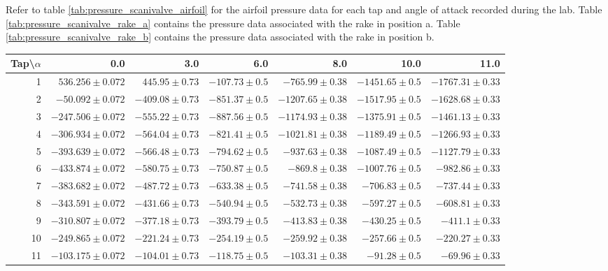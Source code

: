 \documentclass[runningheads]{llncs}
\begin{document}
Refer to table \ref{tab:pressure_scanivalve_airfoil} for the airfoil pressure data for each tap and angle of attack recorded during the lab. Table \ref{tab:pressure_scanivalve_rake_a} contains the pressure data associated with the rake in position a. Table \ref{tab:pressure_scanivalve_rake_b} contains the pressure data associated with the rake in position b.

\begin{table}
\begin{center}
\begin{tabular}{rrrrrrr}
\toprule
{}Tap\textbackslash$\alpha$ &              0.0  &              3.0  &             6.0  &               8.0  &              10.0 &    
           11.0 \\
\midrule
1  &   $536.256\pm0.072$ &   $445.95\pm0.73$ &  $-107.73\pm0.5$ &   $-765.99\pm0.38$ &  $-1451.65\pm0.5$ &  $-1767.31\pm0.33$ \\
2  &   $-50.092\pm0.072$ &  $-409.08\pm0.73$ &  $-851.37\pm0.5$ &  $-1207.65\pm0.38$ &  $-1517.95\pm0.5$ &  $-1628.68\pm0.33$ \\
3  &  $-247.506\pm0.072$ &  $-555.22\pm0.73$ &  $-887.56\pm0.5$ &  $-1174.93\pm0.38$ &  $-1375.91\pm0.5$ &  $-1461.13\pm0.33$ \\
4  &  $-306.934\pm0.072$ &  $-564.04\pm0.73$ &  $-821.41\pm0.5$ &  $-1021.81\pm0.38$ &  $-1189.49\pm0.5$ &  $-1266.93\pm0.33$ \\
5  &  $-393.639\pm0.072$ &  $-566.48\pm0.73$ &  $-794.62\pm0.5$ &   $-937.63\pm0.38$ &  $-1087.49\pm0.5$ &  $-1127.79\pm0.33$ \\
6  &  $-433.874\pm0.072$ &  $-580.75\pm0.73$ &  $-750.87\pm0.5$ &    $-869.8\pm0.38$ &  $-1007.76\pm0.5$ &   $-982.86\pm0.33$ \\
7  &  $-383.682\pm0.072$ &  $-487.72\pm0.73$ &  $-633.38\pm0.5$ &   $-741.58\pm0.38$ &   $-706.83\pm0.5$ &   $-737.44\pm0.33$ \\
8  &  $-343.591\pm0.072$ &  $-431.66\pm0.73$ &  $-540.94\pm0.5$ &   $-532.73\pm0.38$ &   $-597.27\pm0.5$ &   $-608.81\pm0.33$ \\
9  &  $-310.807\pm0.072$ &  $-377.18\pm0.73$ &  $-393.79\pm0.5$ &   $-413.83\pm0.38$ &   $-430.25\pm0.5$ &    $-411.1\pm0.33$ \\
10 &  $-249.865\pm0.072$ &  $-221.24\pm0.73$ &  $-254.19\pm0.5$ &   $-259.92\pm0.38$ &   $-257.66\pm0.5$ &   $-220.27\pm0.33$ \\
11 &  $-103.175\pm0.072$ &  $-104.01\pm0.73$ &  $-118.75\pm0.5$ &   $-103.31\pm0.38$ &    $-91.28\pm0.5$ &    $-69.96\pm0.33$ \\

\end{tabular}
\end{center}
\end{table}
\end{document}
